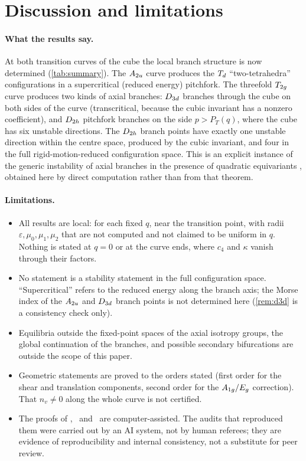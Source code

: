 \section{Discussion and limitations}\label{sec:discussion}

\paragraph{What the results say.} At both transition curves of the cube the local branch structure is now determined
(\cref{tab:summary}). The $A_{2u}$ curve produces the $T_{d}$ ``two-tetrahedra'' configurations in a supercritical (reduced
energy) pitchfork. The threefold $T_{2g}$ curve produces two kinds of axial branches: $D_{3d}$ branches through the cube on
both sides of the curve (transcritical, because the cubic invariant has a nonzero coefficient), and $D_{2h}$ pitchfork
branches on the side $p>P_T(q)$, where the cube has six unstable directions. The $D_{2h}$ branch points have exactly
one unstable direction within the centre space, produced by the cubic invariant, and four in the full rigid-motion-reduced
configuration space. This is an explicit instance of the generic instability of axial branches in the presence of
quadratic equivariants \citep{IhrigGolubitsky1984}, obtained here by direct computation rather than from that theorem.

\paragraph{Limitations.}
\begin{itemize}
\item All results are local: for each fixed $q$, near the transition point, with radii $\varepsilon,\mu_0,\mu_1,\mu_2$ that are
not computed and not claimed to be uniform in $q$. Nothing is stated at $q=0$ or at the curve ends, where $c_4$ and
$\kappa$ vanish through their factors.
\item No statement is a stability statement in the full configuration space. ``Supercritical'' refers to the reduced
energy along the branch axis; the Morse index of the $A_{2u}$ and $D_{3d}$ branch points is not determined here
(\cref{rem:d3d} is a consistency check only).
\item Equilibria outside the fixed-point spaces of the axial isotropy groups, the global continuation of the branches,
and possible secondary bifurcations are outside the scope of this paper.
\item Geometric statements are proved to the orders stated (first order for the shear and translation components,
second order for the $A_{1g}/E_{g}$ correction). That $n_v\ne0$ along the whole curve is not certified.
\item The proofs of \lemM, \lemK\ and \lemQ\ are computer-assisted. The audits that reproduced them were carried out by an
AI system, not by human referees; they are evidence of reproducibility and internal consistency, not a substitute for
peer review.
\end{itemize}

